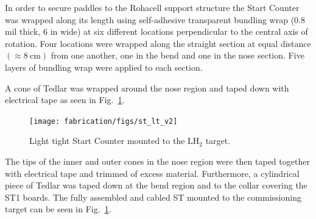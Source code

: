 In order to secure paddles to the Rohacell support structure the Start Counter was wrapped along its length using self-adhesive transparent bundling wrap (0.8 mil thick, 6 in wide) at six different locations perpendicular to the central axis of rotation. Four locations were wrapped along the straight section at equal distance $(\approx 8\ \mathrm{cm})$ from one another, one in the bend and one in the nose section.  Five layers of bundling wrap were applied to each section.%

A cone of Tedlar was wrapped around the nose region and taped down with electrical tape as seen in Fig.~\ref{fig:light_tight_st}. 
\begin{figure}[!htb]
	\centering
	\texttt{[image: fabrication/figs/st\_lt\_v2]}
	\caption{Light tight Start Counter mounted to the \gx{} $\mathrm{LH_{2}}$ target.}
	\label{fig:light_tight_st}
\end{figure}
The tips of the inner and outer cones in the nose region were then taped together with electrical tape and trimmed of excess material. Furthermore, a cylindrical piece of Tedlar was taped down at the bend region and to the collar covering the ST1 boards.  The fully assembled and cabled ST mounted to the commissioning target can be seen in Fig.~\ref{fig:light_tight_st}. 

%








